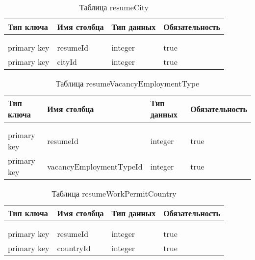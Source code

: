 \begin{xltabular}{\textwidth}{|l|l|p{1.7cm}|X|}
	\caption{Таблица resumeCity \label{resumeCity:table}}\\ \hline
	\centrow Тип ключа & \centrow Имя столбца & \centrow Тип данных & \centrow Обязательность \\ \hline
	 &  &  &  \\ \hline
	\endfirsthead
	 &  &  &  \\ \hline
	\finishhead
	primary key & resumeId & integer & true \\ \hline
	primary key & cityId & integer & true \\ \hline
\end{xltabular}

\begin{xltabular}{\textwidth}{|l|l|p{1.7cm}|X|}
	\caption{Таблица resumeVacancyEmploymentType \label{resumeVacancyEmploymentType:table}}\\ \hline
	\centrow Тип ключа & \centrow Имя столбца & \centrow Тип данных & \centrow Обязательность \\ \hline
	 &  &  &  \\ \hline
	\endfirsthead
	 &  &  &  \\ \hline
	\finishhead
	primary key & resumeId & integer & true \\ \hline
	primary key & vacancyEmploymentTypeId & integer & true \\ \hline
\end{xltabular}

\begin{xltabular}{\textwidth}{|l|l|p{1.7cm}|X|}
	\caption{Таблица resumeWorkPermitCountry \label{resumeWorkPermitCountry:table}}\\ \hline
	\centrow Тип ключа & \centrow Имя столбца & \centrow Тип данных & \centrow Обязательность \\ \hline
	 &  &  &  \\ \hline
	\endfirsthead
	 &  &  &  \\ \hline
	\finishhead
	primary key & resumeId & integer & true \\ \hline
	primary key & countryId & integer & true \\ \hline
\end{xltabular}

